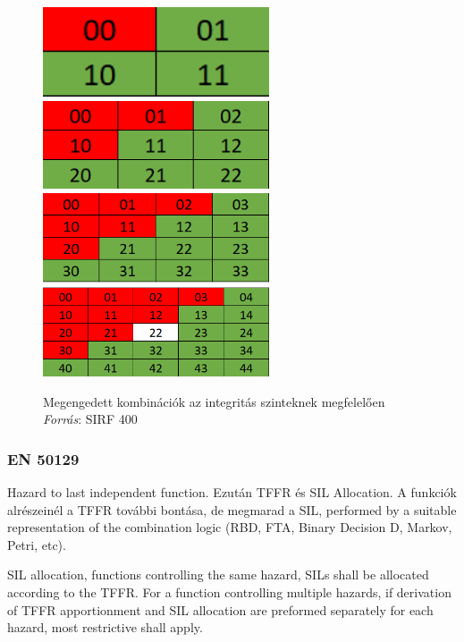\begin{figure}[!ht]
	\centering
	\includegraphics[width=67mm, keepaspectratio]{figures/sirf_sil1.png}\hspace{1cm}
	\includegraphics[width=67mm, keepaspectratio]{figures/sirf_sil2.png}\\\vspace{1cm}
	\includegraphics[width=67mm, keepaspectratio]{figures/sirf_sil3.png}\hspace{1cm}
	\includegraphics[width=67mm, keepaspectratio]{figures/sirf_sil4.png}
	\caption{Megengedett kombinációk az integritás szinteknek megfelelően \emph{Forrás}: SIRF 400}
	\label{fig:sirfSIL}
\end{figure}

\subsubsection{EN 50129}
Hazard to last independent function.
Ezután TFFR és SIL Allocation.
A funkciók alrészeinél a TFFR további bontása, de megmarad a SIL, performed by a suitable representation of the combination logic (RBD, FTA, Binary Decision D, Markov, Petri, etc).

SIL allocation, functions controlling the same hazard, SILs shall be allocated according to the TFFR.
For a function controlling multiple hazards, if derivation of TFFR apportionment and SIL allocation are preformed separately for each hazard, most restrictive shall apply.